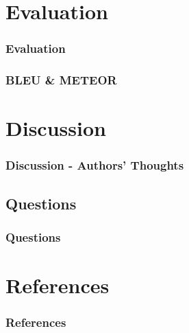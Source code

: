\documentclass[xcolor=dvipsnames]{beamer}
\begin{document}
	\section{Evaluation}
		
		\begin{frame}
			\frametitle{Evaluation}
			
		\end{frame}
	
		\begin{frame}
			\frametitle{BLEU \& METEOR}
			
		\end{frame}
	
	\section{Discussion}
		
		\begin{frame}
			\frametitle{Discussion - Authors' Thoughts}
			
		\end{frame}
	
		\subsection{Questions}
			
			\begin{frame}
				\frametitle{Questions}
				
			\end{frame}
	
	
	\section{References}
		
		\begin{frame}[allowframebreaks]
			\frametitle{References}
			\begin{footnotesize}
				
				
			\end{footnotesize}
		\end{frame}

		
	
\end{document}
